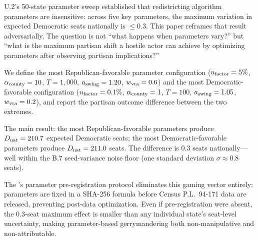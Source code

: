 U.2's 50-state parameter sweep established that redistricting algorithm
parameters are insensitive: across five key parameters, the maximum
variation in expected Democratic seats nationally is $\leq 0.3$.
This paper reframes that result adversarially.
The question is not ``what happens when parameters vary?'' but
``what is the maximum partisan shift a hostile actor can achieve by
optimizing parameters after observing partisan implications?''

We define the most Republican-favorable parameter configuration
($u_{\mathrm{factor}} = 5\%$, $\alpha_{\mathrm{county}} = 10$, $T = 1{,}000$, $a_{\mathrm{swing}} = 1.20$,
$w_{\mathrm{vra}} = 0.6$) and the most Democratic-favorable configuration
($u_{\mathrm{factor}} = 0.1\%$, $\alpha_{\mathrm{county}} = 1$, $T = 100$, $a_{\mathrm{swing}} = 1.05$,
$w_{\mathrm{vra}} = 0.2$), and report the partisan outcome difference between the
two extremes.

The main result: the most Republican-favorable parameters produce
$D_{\mathrm{nat}} = 210.7$ expected Democratic seats; the most Democratic-favorable
parameters produce $D_{\mathrm{nat}} = 211.0$ seats.
The difference is 0.3 seats nationally---well within the B.7 seed-variance
noise floor (one standard deviation $\sigma \approx 0.8$ seats).

The \dia{}'s parameter pre-registration protocol eliminates this gaming vector
entirely: parameters are fixed in a SHA-256 formula before Census P.L.\ 94-171
data are released, preventing post-data optimization.
Even if pre-registration were absent, the 0.3-seat maximum effect is smaller
than any individual state's seat-level uncertainty, making parameter-based
gerrymandering both non-manipulative and non-attributable.
